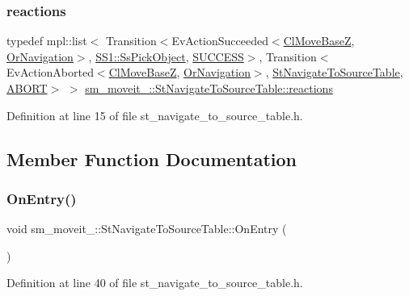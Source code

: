 \subsubsection{\texorpdfstring{reactions}{reactions}}
{\footnotesize\ttfamily typedef mpl\+::list$<$ Transition$<$Ev\+Action\+Succeeded$<$\hyperlink{classcl__move__base__z_1_1ClMoveBaseZ}{Cl\+Move\+BaseZ}, \hyperlink{classsm__moveit__4_1_1OrNavigation}{Or\+Navigation}$>$, \hyperlink{structsm__moveit__4_1_1SS1_1_1SsPickObject}{S\+S1\+::\+Ss\+Pick\+Object}, \hyperlink{classSUCCESS}{S\+U\+C\+C\+E\+SS}$>$, Transition$<$Ev\+Action\+Aborted$<$\hyperlink{classcl__move__base__z_1_1ClMoveBaseZ}{Cl\+Move\+BaseZ}, \hyperlink{classsm__moveit__4_1_1OrNavigation}{Or\+Navigation}$>$, \hyperlink{structsm__moveit__4_1_1StNavigateToSourceTable}{St\+Navigate\+To\+Source\+Table}, \hyperlink{classABORT}{A\+B\+O\+RT}$>$ $>$ \hyperlink{structsm__moveit__4_1_1StNavigateToSourceTable_a83fbcaf1bf1abdbcac936c6c3201893d}{sm\+\_\+moveit\+\_\+::\+St\+Navigate\+To\+Source\+Table\+::reactions}}



Definition at line 15 of file st\+\_\+navigate\+\_\+to\+\_\+source\+\_\+table.\+h.



\subsection{Member Function Documentation}
\mbox{\label{structsm__moveit__4_1_1StNavigateToSourceTable_aa90111c5a22ed67dfe20024a7b135837}} 
\subsubsection{\texorpdfstring{On\+Entry()}{OnEntry()}}
{\footnotesize\ttfamily void sm\+\_\+moveit\+\_\+::\+St\+Navigate\+To\+Source\+Table\+::\+On\+Entry (\begin{DoxyParamCaption}{ }\end{DoxyParamCaption})\hspace{0.3cm}{\ttfamily [inline]}}



Definition at line 40 of file st\+\_\+navigate\+\_\+to\+\_\+source\+\_\+table.\+h.


